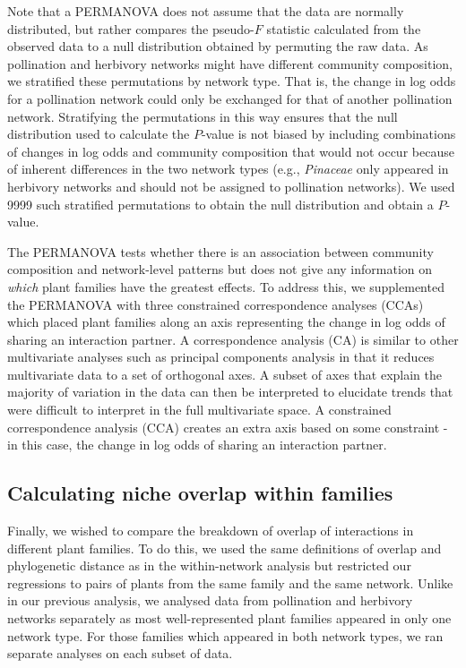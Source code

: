 \documentclass[12pt]{article}
\begin{document}
\begin{spacing}{1.5}
  Note that a PERMANOVA does not assume that the data are 
  normally distributed, but rather compares the pseudo-$F$ 
  statistic calculated from the observed data to a null 
  distribution obtained by permuting the raw data. As 
  pollination and herbivory networks might have different
  community composition, we stratified these permutations
  by network type. That is, the change in log odds for a pollination
  network could only be exchanged for that of another pollination
  network. Stratifying the permutations in this way ensures that 
  the null distribution used to calculate the $P$-value is not 
  biased by including combinations of changes in log odds and 
  community composition that would not occur because of inherent 
  differences in the two network types (e.g., \emph{Pinaceae} 
  only appeared in herbivory networks and should not be assigned 
  to pollination networks). We used 9999 such stratified permutations 
  to obtain the null distribution and obtain a $P$-value.


  The PERMANOVA tests whether there is an association between
  community composition and network-level patterns but does not
  give any information on \emph{which} plant families have the
  greatest effects. To address this, we supplemented the 
  PERMANOVA with three constrained correspondence analyses (CCAs)
  which placed plant families along an axis representing the
  change in log odds of sharing an interaction partner.
  A correspondence 
  analysis (CA) is similar to other multivariate
  analyses such as principal components analysis in that it
  reduces multivariate data to a set of orthogonal axes. A
  subset of axes that explain the majority of variation in 
  the data can then be interpreted to elucidate trends that
  were difficult to interpret in the full multivariate space.
  A constrained correspondence analysis (CCA) creates an extra
  axis based on some constraint - in this case, the change in
  log odds of sharing an interaction partner. 


\subsection*{Calculating niche overlap within families}


  Finally, we wished to compare the breakdown of overlap of interactions in
  different plant families. To do this, we used the same definitions of overlap
  and phylogenetic distance as in the within-network analysis but restricted
  our regressions to pairs of plants from the same family and the same network.
  Unlike in our previous analysis, we analysed data from pollination and
  herbivory networks separately as most well-represented plant families appeared
  in only one network type. For those families which appeared in both network types, 
  we ran separate analyses on each subset of data.



\end{spacing}
\end{document}
